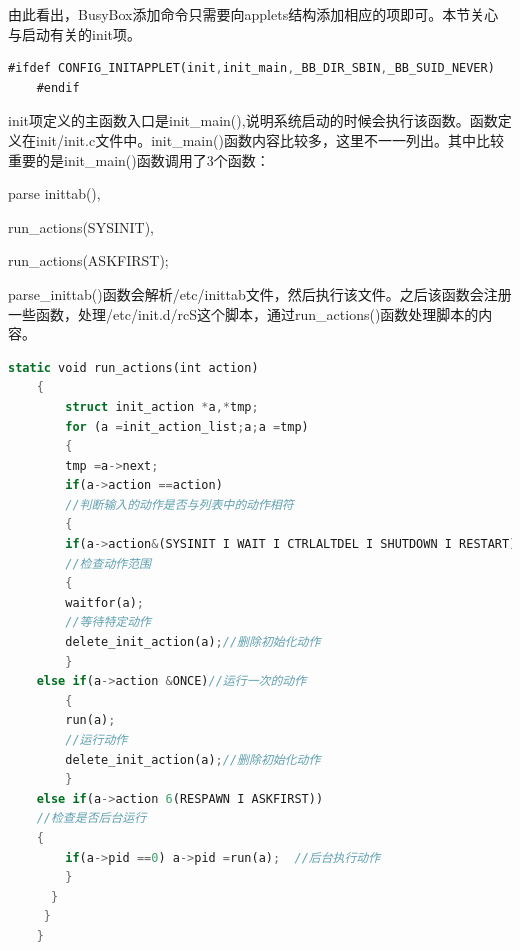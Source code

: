 由此看出，BusyBox添加命令只需要向applets结构添加相应的项即可。本节关心与启动有关的init项。

\begin{lstlisting}[language=Rust]
	#ifdef CONFIG_INITAPPLET(init,init_main,_BB_DIR_SBIN,_BB_SUID_NEVER)
	#endif
\end{lstlisting}

init项定义的主函数入口是init\_main(),说明系统启动的时候会执行该函数。函数定义在init/init.c文件中。init\_main()函数内容比较多，这里不一一列出。其中比较重要的是init\_main()函数调用了3个函数：

parse inittab(),

run\_actions(SYSINIT),

run\_actions(ASKFIRST);

parse\_inittab()函数会解析/etc/inittab文件，然后执行该文件。之后该函数会注册一些函数，处理/etc/init.d/rcS这个脚本，通过run\_actions()函数处理脚本的内容。
\begin{lstlisting}[language=Rust]
	static void run_actions(int action)
	{
		struct init_action *a,*tmp;
		for (a =init_action_list;a;a =tmp)
		{
		tmp =a->next;
		if(a->action ==action)
		//判断输入的动作是否与列表中的动作相符
		{
		if(a->action&(SYSINIT I WAIT I CTRLALTDEL I SHUTDOWN I RESTART))
		//检查动作范围
		{
		waitfor(a);
		//等待特定动作
		delete_init_action(a);//删除初始化动作
	    }
	else if(a->action &ONCE)//运行一次的动作
	    {
		run(a);
		//运行动作
		delete_init_action(a);//删除初始化动作
	    }
	else if(a->action 6(RESPAWN I ASKFIRST))
	//检查是否后台运行
	{
		if(a->pid ==0) a->pid =run(a);  //后台执行动作
	    }
      }
     }
    }
\end{lstlisting}

